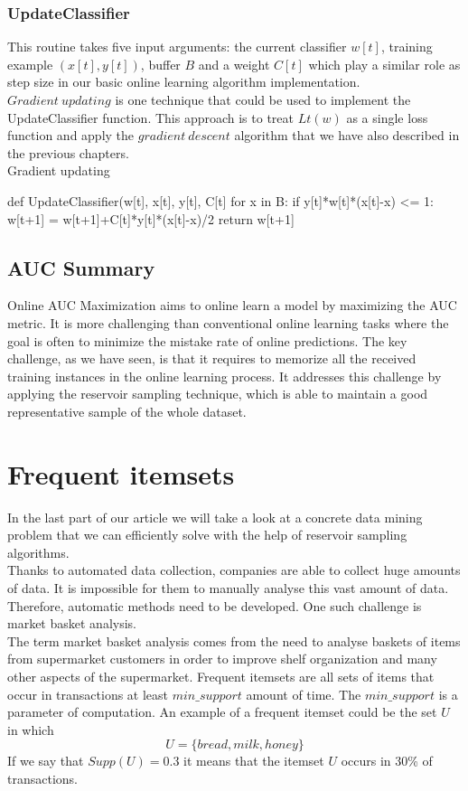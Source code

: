 \documentclass[journal]{IEEEtran/IEEEtran}
\begin{document}
\subsubsection*{UpdateClassifier} 
This routine takes five input arguments: the current classifier $w[t]$, training example $(x[t], y[t])$, buffer $B$ and a weight $C[t]$ which play a similar role as step size in our basic online learning algorithm implementation. $Gradient\ updating$ is one technique that could be used to implement the UpdateClassifier function. This approach is to treat $Lt(w)$ as a single loss function and apply the $gradient\ descent$ algorithm that we have also described in the previous chapters.\\
Gradient updating
\begin{code}
def UpdateClassifier(w[t], x[t], y[t], C[t]
  for x in B:
    if y[t]*w[t]*(x[t]-x) <= 1:
      w[t+1] = w[t+1]+C[t]*y[t]*(x[t]-x)/2
  return w[t+1]
\end{code}
\subsection{AUC Summary}
Online AUC Maximization aims to online learn a model by maximizing the AUC metric. It is more challenging than conventional online learning tasks where the goal is often to minimize the mistake rate of online predictions. The key challenge, as we have seen, is that it requires to memorize all the received training instances in the online learning process. It addresses this challenge by applying the reservoir sampling technique, which is able to maintain a good representative sample of the whole dataset.

\section{Frequent itemsets}
In the last part of our article we will take a look at a concrete data mining problem that we can efficiently solve with the help of reservoir sampling algorithms.\\

Thanks to automated data collection, companies are able to collect huge amounts of data. It is impossible for them to manually analyse this vast amount of data. Therefore, automatic methods need to be developed. One such challenge is market basket analysis.\\

The term market basket analysis comes from the need to analyse baskets of items from supermarket customers in order to improve shelf organization and many other aspects of the supermarket. Frequent itemsets are all sets of items that occur in transactions at least $min\_support$ amount of time. The $min\_support$ is a parameter of computation. An example of a frequent itemset could be the set $U$ in which $$U = \{bread, milk, honey\}$$ If we say that $Supp(U) = 0.3$ it means that the itemset $U$ occurs in 30\% of transactions. 
\end{document}

